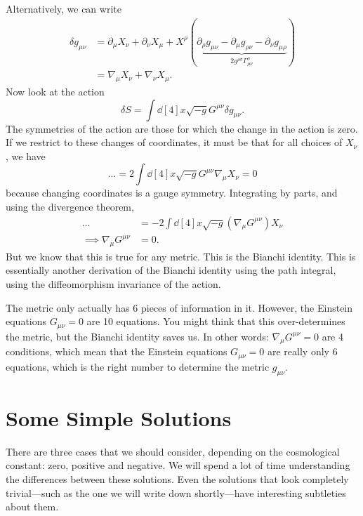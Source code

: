 Alternatively, we can write 
\begin{align}
  \delta g_{\mu\nu} &= \partial_{\mu} X_{\nu} + \partial_{\nu} X_{\mu} + X^{\rho}(\underbrace{\partial_{\rho} g_{\mu\nu} - \partial_{\mu} g_{\rho\nu} - \partial_{\nu} g_{\mu\rho}}_{2 g^{\rho\sigma} \Gamma^{\sigma}_{\mu\nu}}) \\
		    &= \nabla_{\mu} X_{\nu} + \nabla_{\nu} X_{\mu}.
\end{align}
Now look at the action
\begin{equation}
  \delta S = \int \dd[4]{x} \sqrt{-g} G^{\mu\nu} \delta g_{\mu\nu}.
\end{equation}
The symmetries of the action are those for which the change in the action is zero.
If we restrict to these changes of coordinates, it must be that for all choices of $X_{\nu}$, we have
\begin{equation}
  \dots = 2 \int \dd[4]{x} \sqrt{-g} G^{\mu\nu} \nabla_{\mu} X_{\nu} = 0
\end{equation}
because changing coordinates is a gauge symmetry.
Integrating by parts, and using the divergence theorem,
\begin{align}
  \dots &= -2 \int \dd[4]{x} \sqrt{-g} (\nabla_{\mu} G^{\mu\nu}) X_{\nu} \\
  \implies \nabla_{\mu} G^{\mu\nu} &= 0.
\end{align}
But we know that this is true for any metric. This is the Bianchi identity.
This is essentially another derivation of the Bianchi identity using the path integral, using the diffeomorphism invariance of the action.
\begin{leftbar}
  \begin{remark}
    The metric only actually has 6 pieces of information in it. However, the Einstein equations $G_{\mu\nu} = 0$ are 10 equations. You might think that this over-determines the metric, but the Bianchi identity saves us.
    In other words: $\nabla_{\mu} G^{\mu\nu} = 0$ are 4 conditions, which mean that the Einstein equations $G_{\mu\nu} = 0$ are really only 6 equations, which is the right number to determine the metric $g_{\mu\nu}$.
  \end{remark}
\end{leftbar}

\section{Some Simple Solutions}%
\label{sec:some_simple_solutions}

There are three cases that we should consider, depending on the cosmological constant: zero, positive and negative.
We will spend a lot of time understanding the differences between these solutions. Even the solutions that look completely trivial---such as the one we will write down shortly---have interesting subtleties about them.

